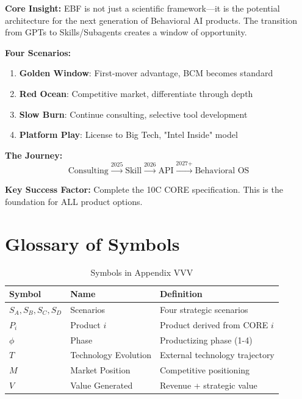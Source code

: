 \begin{tcolorbox}[colback=gray!5!white, colframe=gray!75!black,
    title=Appendix VVV Summary: Business Model \& Productizing]

\textbf{Core Insight:}
EBF is not just a scientific framework---it is the potential architecture for the next generation of Behavioral AI products. The transition from GPTs to Skills/Subagents creates a window of opportunity.

\textbf{Four Scenarios:}
\begin{enumerate}[nosep]
\item \textbf{Golden Window}: First-mover advantage, BCM becomes standard
\item \textbf{Red Ocean}: Competitive market, differentiate through depth
\item \textbf{Slow Burn}: Continue consulting, selective tool development
\item \textbf{Platform Play}: License to Big Tech, "Intel Inside" model
\end{enumerate}

\textbf{The Journey:}
\[
\text{Consulting} \xrightarrow{\text{2025}} \text{Skill} \xrightarrow{\text{2026}} \text{API} \xrightarrow{\text{2027+}} \text{Behavioral OS}
\]

\textbf{Key Success Factor:}
Complete the 10C CORE specification. This is the foundation for ALL product options.

\end{tcolorbox}


\section{Glossary of Symbols}
\label{sec:vvv-glossary}

\begin{table}[htbp]
\centering
\caption{Symbols in Appendix VVV}
\label{tab:vvv-symbols}
\renewcommand{\arraystretch}{1.3}
\begin{tabular}{@{}lll@{}}
\toprule
\textbf{Symbol} & \textbf{Name} & \textbf{Definition} \\
\midrule
$S_A, S_B, S_C, S_D$ & Scenarios & Four strategic scenarios \\
$P_{i}$ & Product $i$ & Product derived from CORE $i$ \\
$\phi$ & Phase & Productizing phase (1-4) \\
$T$ & Technology Evolution & External technology trajectory \\
$M$ & Market Position & Competitive positioning \\
$V$ & Value Generated & Revenue + strategic value \\
\bottomrule
\end{tabular}
\end{table}


